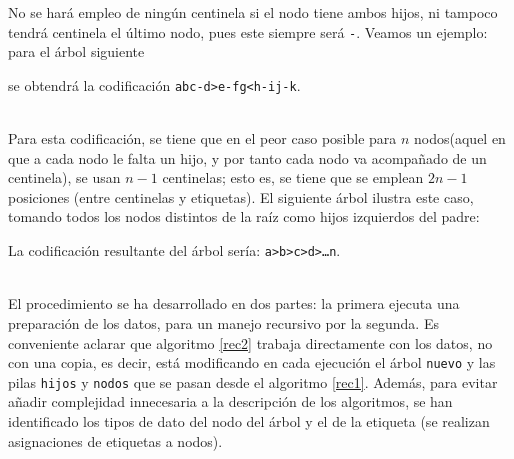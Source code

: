 \documentclass[a4paper,10pt]{scrartcl}
\begin{document}
 No se hará empleo de ningún centinela si el nodo tiene ambos hijos,
 ni tampoco tendrá centinela el último nodo, pues este 
 siempre será \texttt{-}. Veamos un ejemplo: para el árbol siguiente
 
 \begin{center}
 \begin{minipage}{80pt}
 \end{minipage}
 \end{center}
 
 se obtendrá la codificación \texttt{abc-d>e-fg<h-ij-k}.\\\ %
 
 Para esta codificación, se tiene que en el peor caso posible para
 $n$ nodos(aquel en que a cada nodo le falta un hijo, y por tanto cada nodo va acompañado
 de un centinela), se usan $n-1$ centinelas; esto es, se tiene que se
 emplean $2n-1$ posiciones (entre centinelas y etiquetas). 
 El siguiente árbol ilustra este caso, tomando todos los nodos distintos de la raíz como
 hijos izquierdos del padre:\\
 
 \begin{center}
 \begin{minipage}{20pt}
 \end{minipage}
 \end{center}
 
 La codificación resultante del árbol sería: \texttt{a>b>c>d>\ldots n}.\\\
 
 El procedimiento se ha desarrollado en dos partes: la primera ejecuta una
 preparación de los datos, para un manejo recursivo por la segunda. Es conveniente
 aclarar que algoritmo \ref{rec2} trabaja directamente con los
 datos, no con una copia, es decir, está modificando en cada ejecución
 el árbol \texttt{nuevo} y las pilas \texttt{hijos} y \texttt{nodos} que se pasan 
 desde el algoritmo \ref{rec1}. Además, para evitar añadir complejidad
 innecesaria a la descripción de los algoritmos, se han identificado los
 tipos de dato del nodo del árbol y el de la etiqueta (se realizan asignaciones
 de etiquetas a nodos).
  
\end{document}
